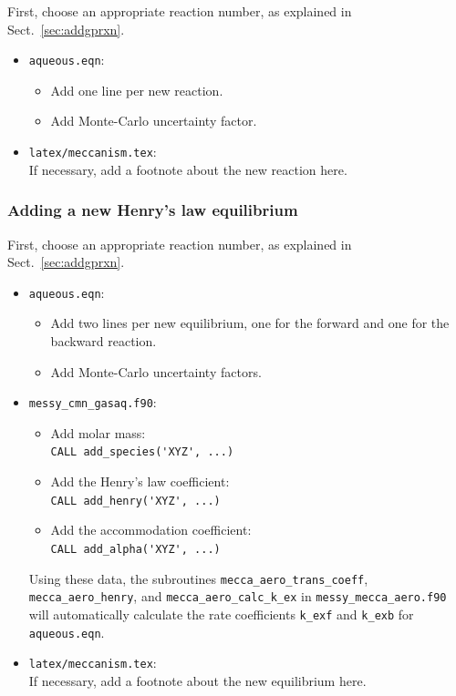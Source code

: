 \documentclass[twoside]{article}
\def\nosep{\setlength\parsep{0mm}\setlength\topsep{0mm}\setlength\itemsep{0mm}}
\begin{document}
First, choose an appropriate reaction number, as explained in
Sect.~\ref{sec:addgprxn}.

\begin{itemize}\nosep
\item \verb|aqueous.eqn|:
  \begin{itemize}
  \item Add one line per new reaction.
  \item Add Monte-Carlo uncertainty factor.
  \end{itemize}
\item \verb|latex/meccanism.tex|:\\
  If necessary, add a footnote about the new reaction here.
\end{itemize}

\subsubsection{Adding a new Henry's law equilibrium}

First, choose an appropriate reaction number, as explained in
Sect.~\ref{sec:addgprxn}.

\begin{itemize}\nosep
\item \verb|aqueous.eqn|:
  \begin{itemize}
  \item Add two lines per new equilibrium, one for the forward and one
    for the backward reaction.
  \item Add Monte-Carlo uncertainty factors.
  \end{itemize}
\item \verb|messy_cmn_gasaq.f90|:
  \begin{itemize}
  \item Add molar mass:\\
    \verb|CALL add_species('XYZ', ...)|
  \item Add the Henry's law coefficient:\\
    \verb|CALL add_henry('XYZ', ...)|
  \item Add the accommodation coefficient:\\
    \verb|CALL add_alpha('XYZ', ...)|
  \end{itemize}
  Using these data, the subroutines
  \verb|mecca_aero_trans_coeff|, \verb|mecca_aero_henry|,
  and \verb|mecca_aero_calc_k_ex| in
  \verb|messy_mecca_aero.f90| will automatically calculate
  the rate coefficients \verb|k_exf| and \verb|k_exb| for
  \verb|aqueous.eqn|.
\item \verb|latex/meccanism.tex|:\\
  If necessary, add a footnote about the new equilibrium here.
\end{itemize}
\end{document}
